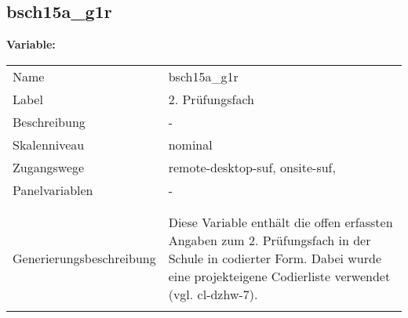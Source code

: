 	
	
	\subsection{bsch15a\_g1r}
	\label{subSection:bsch15a_g1r}

	\noindent\textbf{Variable:}\\
		\begin{tabular}{lL{11.3cm}}
			\label{tableVariable:bsch15a_g1r}
			Name & bsch15a\_g1r \\
			Label & 2. Prüfungsfach \\
			Beschreibung & - \\
			Skalenniveau & nominal \\
			Zugangswege &
				remote-desktop-suf,
				onsite-suf,
 \\
			Panelvariablen & -
			 \\
			 \\
 \\
					Generierungsbeschreibung & Diese Variable enthält die offen erfassten Angaben zum 2. Prüfungsfach in der Schule in codierter Form. Dabei wurde eine projekteigene Codierliste verwendet (vgl. cl-dzhw-7).
				 \\	
			 \\
		\end{tabular}






